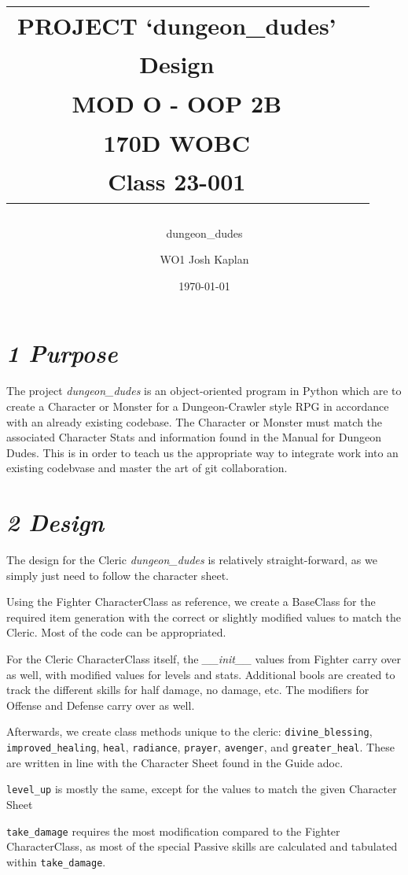 \documentclass[11pt]{extbook}
\title{%
\begin{tabular}{cl}
PROJECT `dungeon\_dudes'\tabularnewline
\large Design\tabularnewline
\large MOD O - OOP 2B\tabularnewline
\small 170D WOBC\tabularnewline
\small Class 23-001\tabularnewline
\end{tabular}
}
\subtitle{\large dungeon\_dudes}
\author{%
\begin{tabular}{cl}
WO1 Josh Kaplan
\end{tabular}
}
\date{\today}
\newcommand\tab[1][1cm]{\hspace*{#1}}
\begin{document}
\maketitle

\section*{\emph{1 Purpose}}

\tab The project \emph{dungeon\_dudes} is an object-oriented program in Python 
which are to create a Character or Monster for a Dungeon-Crawler style RPG
in accordance with an already existing codebase. The Character or Monster must
match the associated Character Stats and information found in the Manual for 
Dungeon Dudes. This is in order to teach us the appropriate way to integrate 
work into an existing codebvase and master the art of git collaboration. 

\section*{\emph{2 Design}}

\tab The design for the Cleric \emph{dungeon\_dudes} is relatively 
straight-forward, as we simply just need to follow the character sheet.

\tab Using the Fighter CharacterClass as reference, we create a BaseClass for
the required item generation with the correct or slightly modified values to 
match the Cleric. Most of the code can be appropriated.

\tab For the Cleric CharacterClass itself, the \emph{\_\_init\_\_} values from 
Fighter carry over as well, with modified values for levels and stats. 
Additional bools are created to track the different skills for half damage, no 
damage, etc. The modifiers for Offense and Defense carry over as well. 

\tab Afterwards, we create class methods unique to the cleric: 
\verb|divine_blessing|, \verb|improved_healing|, \verb|heal|,
\verb|radiance|, \verb|prayer|, \verb|avenger|, and
\verb|greater_heal|. These are written in line with the Character Sheet found 
in the Guide adoc.

\tab \verb|level_up| is mostly the same, except for the values to match the 
given Character Sheet

\tab \verb|take_damage| requires the most modification compared to the 
Fighter CharacterClass, as most of the special Passive skills are calculated
and tabulated within \verb|take_damage|.
\end{document}
